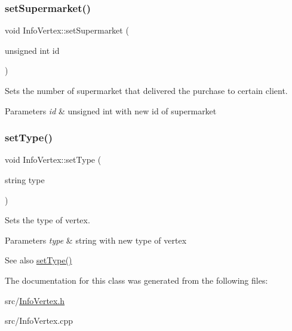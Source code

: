 \subsubsection{\texorpdfstring{set\+Supermarket()}{setSupermarket()}}
{\footnotesize\ttfamily void Info\+Vertex\+::set\+Supermarket (\begin{DoxyParamCaption}\item[{unsigned int}]{id }\end{DoxyParamCaption})}



Sets the number of supermarket that delivered the purchase to certain client. 


\begin{DoxyParams}{Parameters}
{\em id} & unsigned int with new id of supermarket \\
\hline
\end{DoxyParams}
\hypertarget{class_info_vertex_acb303f5d189b539e0b1b42c716ee0130}{}\label{class_info_vertex_acb303f5d189b539e0b1b42c716ee0130} 
\subsubsection{\texorpdfstring{set\+Type()}{setType()}}
{\footnotesize\ttfamily void Info\+Vertex\+::set\+Type (\begin{DoxyParamCaption}\item[{string}]{type }\end{DoxyParamCaption})}



Sets the type of vertex. 


\begin{DoxyParams}{Parameters}
{\em type} & string with new type of vertex \\
\hline
\end{DoxyParams}
\begin{DoxySeeAlso}{See also}
\hyperlink{class_info_vertex_acb303f5d189b539e0b1b42c716ee0130}{set\+Type()} 
\end{DoxySeeAlso}


The documentation for this class was generated from the following files\+:\begin{DoxyCompactItemize}
\item 
src/\hyperlink{_info_vertex_8h}{Info\+Vertex.\+h}\item 
src/Info\+Vertex.\+cpp\end{DoxyCompactItemize}
